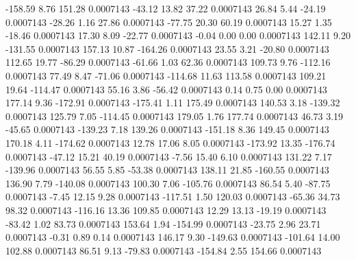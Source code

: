      -158.59        8.76      151.28     0.0007143
      -43.12       13.82       37.22     0.0007143
       26.84        5.44      -24.19     0.0007143
      -28.26        1.16       27.86     0.0007143
      -77.75       20.30       60.19     0.0007143
       15.27        1.35      -18.46     0.0007143
       17.30        8.09      -22.77     0.0007143
       -0.04        0.00        0.00     0.0007143
      142.11        9.20     -131.55     0.0007143
      157.13       10.87     -164.26     0.0007143
       23.55        3.21      -20.80     0.0007143
      112.65       19.77      -86.29     0.0007143
      -61.66        1.03       62.36     0.0007143
      109.73        9.76     -112.16     0.0007143
       77.49        8.47      -71.06     0.0007143
     -114.68       11.63      113.58     0.0007143
      109.21       19.64     -114.47     0.0007143
       55.16        3.86      -56.42     0.0007143
        0.14        0.75        0.00     0.0007143
      177.14        9.36     -172.91     0.0007143
     -175.41        1.11      175.49     0.0007143
      140.53        3.18     -139.32     0.0007143
      125.79        7.05     -114.45     0.0007143
      179.05        1.76      177.74     0.0007143
       46.73        3.19      -45.65     0.0007143
     -139.23        7.18      139.26     0.0007143
     -151.18        8.36      149.45     0.0007143
      170.18        4.11     -174.62     0.0007143
       12.78       17.06        8.05     0.0007143
     -173.92       13.35     -176.74     0.0007143
      -47.12       15.21       40.19     0.0007143
       -7.56       15.40        6.10     0.0007143
      131.22        7.17     -139.96     0.0007143
       56.55        5.85      -53.38     0.0007143
      138.11       21.85     -160.55     0.0007143
      136.90        7.79     -140.08     0.0007143
      100.30        7.06     -105.76     0.0007143
       86.54        5.40      -87.75     0.0007143
       -7.45       12.15        9.28     0.0007143
     -117.51        1.50      120.03     0.0007143
      -65.36       34.73       98.32     0.0007143
     -116.16       13.36      109.85     0.0007143
       12.29       13.13      -19.19     0.0007143
      -83.42        1.02       83.73     0.0007143
      153.64        1.94     -154.99     0.0007143
      -23.75        2.96       23.71     0.0007143
       -0.31        0.89        0.14     0.0007143
      146.17        9.30     -149.63     0.0007143
     -101.64       14.00      102.88     0.0007143
       86.51        9.13      -79.83     0.0007143
     -154.84        2.55      154.66     0.0007143
